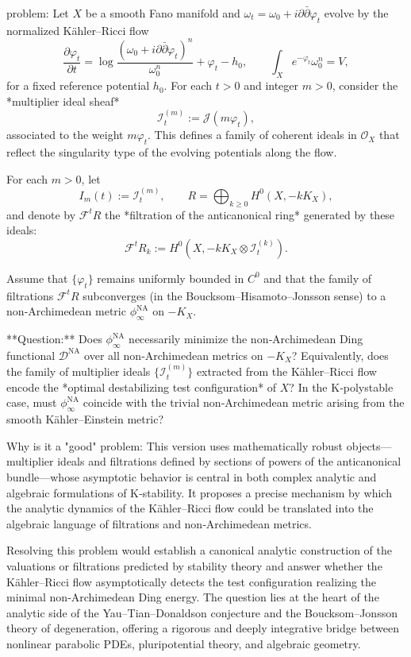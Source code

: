 problem:  
Let \( X \) be a smooth Fano manifold and \( \omega_t = \omega_0 + i\partial\bar{\partial}\varphi_t \) evolve by the normalized Kähler–Ricci flow  
\[
\frac{\partial \varphi_t}{\partial t} = \log \frac{(\omega_0 + i\partial\bar{\partial}\varphi_t)^n}{\omega_0^n} + \varphi_t - h_0, 
\qquad \int_X e^{-\varphi_t}\omega_0^n = V,
\]
for a fixed reference potential \( h_0 \).  
For each \(t > 0\) and integer \(m > 0\), consider the *multiplier ideal sheaf*  
\[
\mathcal{I}_t^{(m)} := \mathcal{J}(m\varphi_t),
\]
associated to the weight \( m \varphi_t \).  This defines a family of coherent ideals in \( \mathcal{O}_X \) that reflect the singularity type of the evolving potentials along the flow.  

For each \(m>0\), let
\[
I_m(t) := \mathcal{I}_t^{(m)},
\qquad
R = \bigoplus_{k\ge 0} H^0(X, -kK_X),
\]
and denote by \(\mathcal{F}^t R\) the *filtration of the anticanonical ring* generated by these ideals:
\[
\mathcal{F}^t R_k := H^0(X, -kK_X\otimes \mathcal{I}_t^{(k)}).
\]

Assume that \(\{\varphi_t\}\) remains uniformly bounded in \(C^0\) and that the family of filtrations \(\mathcal{F}^t R\) subconverges (in the Boucksom–Hisamoto–Jonsson sense) to a non‑Archimedean metric \(\phi_\infty^{\mathrm{NA}}\) on \(-K_X\).  

**Question:**  
Does \(\phi_\infty^{\mathrm{NA}}\) necessarily minimize the non‑Archimedean Ding functional \(\mathcal{D}^{\mathrm{NA}}\) over all non‑Archimedean metrics on \(-K_X\)?  
Equivalently, does the family of multiplier ideals \(\{\mathcal{I}_t^{(m)}\}\) extracted from the Kähler–Ricci flow encode the *optimal destabilizing test configuration* of \(X\)?  
In the K‑polystable case, must \(\phi_\infty^{\mathrm{NA}}\) coincide with the trivial non‑Archimedean metric arising from the smooth Kähler–Einstein metric?  

Why is it a "good" problem:  
This version uses mathematically robust objects—multiplier ideals and filtrations defined by sections of powers of the anticanonical bundle—whose asymptotic behavior is central in both complex analytic and algebraic formulations of K‑stability. It proposes a precise mechanism by which the analytic dynamics of the Kähler–Ricci flow could be translated into the algebraic language of filtrations and non‑Archimedean metrics.  

Resolving this problem would establish a canonical analytic construction of the valuations or filtrations predicted by stability theory and answer whether the Kähler–Ricci flow asymptotically detects the test configuration realizing the minimal non‑Archimedean Ding energy. The question lies at the heart of the analytic side of the Yau–Tian–Donaldson conjecture and the Boucksom–Jonsson theory of degeneration, offering a rigorous and deeply integrative bridge between nonlinear parabolic PDEs, pluripotential theory, and algebraic geometry.